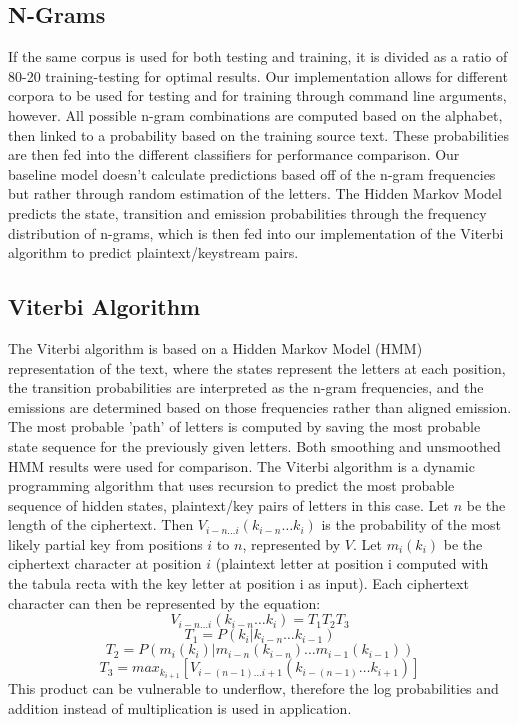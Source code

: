 \documentclass[11pt,letterpaper]{article}
\begin{document}
\subsection{N-Grams}
If the same corpus is used for both testing and training, it is divided as a ratio of 80-20 training-testing for optimal results. Our implementation allows for different corpora to be used for testing and for training through command line arguments, however. All possible n-gram combinations are computed based on the alphabet, then linked to a probability based on the training source text. These probabilities are then fed into the different classifiers for performance comparison. Our baseline model doesn't calculate predictions based off of the n-gram frequencies but rather through random estimation of the letters. The Hidden Markov Model predicts the state, transition and emission probabilities through the frequency distribution of n-grams, which is then fed into our implementation of the Viterbi algorithm to predict plaintext/keystream pairs.

\subsection{Viterbi Algorithm}
The Viterbi algorithm is based on a Hidden Markov Model (HMM) representation of the text, where the states represent the letters at each position, the transition probabilities are interpreted as the n-gram frequencies, and the emissions are determined based on those frequencies rather than aligned emission. The most probable 'path' of letters is computed by saving the most probable state sequence for the previously given letters. Both smoothing and unsmoothed HMM results were used for comparison.
The Viterbi algorithm is a dynamic programming algorithm that uses recursion to predict the most probable sequence of hidden states, plaintext/key pairs of letters in this case. Let $n$ be the length of the ciphertext. Then $V_{i-n \dots i}(k_{i-n}\dots k_i)$ is the probability of the most likely partial key from positions $i$ to $n$, represented by $V$. Let $m_i(k_i)$ be the ciphertext character at position $i$ (plaintext letter at position i computed with the tabula recta with the key letter at position i as input). Each ciphertext character can then be represented by the equation:
$$V_{i-n \dots i}(k_{i-n}\dots k_i) = T_1 T_2 T_3 $$
$$T_1 = P(k_i | k_{i-n}\dots k_{i-1}) $$
$$T_2 = P(m_i(k_i) | m_{i-n}(k_{i-n}) \dots m_{i-1}(k_{i-1})) $$
$$T_3 = max_{k_{i+1}}[V_{i-(n-1) \dots i+1}(k_{i-(n-1)}\dots k_{i+1})]$$
This product can be vulnerable to underflow, therefore the log probabilities and addition instead of multiplication is used in application.
\end{document}
